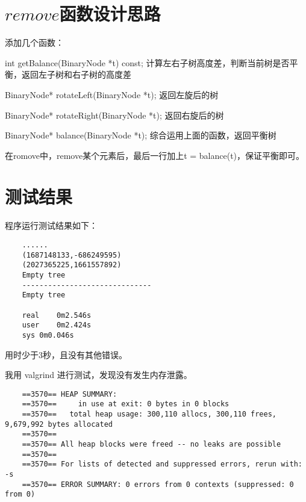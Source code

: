 \documentclass[UTF8]{ctexart}
\begin{document}
\pagestyle{fancy}
\fancyhead{}

\section{$remove$函数设计思路}
添加几个函数：\par
int getBalance(BinaryNode *t) const; 计算左右子树高度差，判断当前树是否平衡，返回左子树和右子树的高度差\par
BinaryNode* rotateLeft(BinaryNode *t); 返回左旋后的树\par
BinaryNode* rotateRight(BinaryNode *t); 返回右旋后的树\par
BinaryNode* balance(BinaryNode *t); 综合运用上面的函数，返回平衡树\par
在romove中，remove某个元素后，最后一行加上t = balance(t)，保证平衡即可。\par
\section{测试结果}
程序运行测试结果如下：
\begin{lstlisting}
    ......
    (1687148133,-686249595)
    (2027365225,1661557892)
    Empty tree
    ------------------------------
    Empty tree
    
    real	0m2.546s
    user	0m2.424s
    sys	0m0.046s    
\end{lstlisting}
用时少于3秒，且没有其他错误。\par
我用 valgrind 进行测试，发现没有发生内存泄露。
\begin{lstlisting}
    ==3570== HEAP SUMMARY:
    ==3570==     in use at exit: 0 bytes in 0 blocks
    ==3570==   total heap usage: 300,110 allocs, 300,110 frees, 9,679,992 bytes allocated
    ==3570== 
    ==3570== All heap blocks were freed -- no leaks are possible
    ==3570== 
    ==3570== For lists of detected and suppressed errors, rerun with: -s
    ==3570== ERROR SUMMARY: 0 errors from 0 contexts (suppressed: 0 from 0)
\end{lstlisting}
\end{document}
